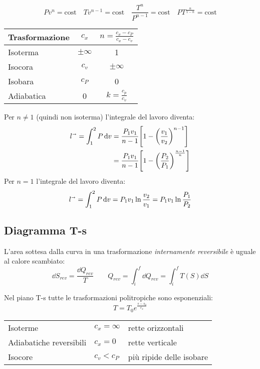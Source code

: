 \[
    Pv^n = \text{cost} \quad Tv^{n-1} = \text{cost} \quad \frac{T^n}{P^{n-1}} = \text{cost} \quad PT^{\frac{n}{1-n}} = \text{cost}
\]

\begin{tabular}{lcc}
    \toprule
    Trasformazione & $c_x$ & $n = \frac{c_x-c_P}{c_x-c_v}$ \\
    \midrule
    Isoterma & $\pm\infty$ & 1 \\
    Isocora & $c_v$ & $\pm\infty$ \\
    Isobara & $c_P$ & 0 \\
    Adiabatica & 0 & $k = \frac{c_p}{c_v}$ \\
    \bottomrule
\end{tabular}

Per $n \ne 1$ (quindi non isoterma) l'integrale del lavoro diventa:
\begin{align*}
    l^\shortrightarrow = \int_1^2 P\dd{v} &= \frac{P_1v_1}{n-1} \qty[1-\qty(\frac{v_1}{v_2})^{n-1}] \\
    &= \frac{P_1v_1}{n-1} \qty[1-\qty(\frac{P_2}{P_1})^{\frac{n-1}{n}}]
\end{align*}
Per $n = 1$ l'integrale del lavoro diventa:
\[ l^\shortrightarrow = \int_1^2 P\dd{v} = P_1v_1\ln{\frac{v_2}{v_1}} = P_1v_1\ln{\frac{P_1}{P_2}} \]

\subsection{Diagramma T-s}

L'area sottesa dalla curva in una trasformazione \emph{internamente reversibile} è uguale al calore scambiato:
\[ \dd{S}_{rev} = \frac{\dd{Q}_{rev}}{T} \qquad Q_{rev} = \int_i^f \dd{Q}_{rev} = \int_i^f T(S) \dd{S} \]

Nel piano T-s tutte le trasformazioni politropiche sono esponenziali:
\[T = T_0 e ^ { \frac{s-s_0}{c_x} }\]

\begin{tabular}{lll}
    Isoterme & $c_x = \infty$ & rette orizzontali \\
    Adiabatiche reversibili & $c_x = 0$ & rette verticale \\
    Isocore & $c_v < c_P$ & più ripide delle isobare \\
\end{tabular}

